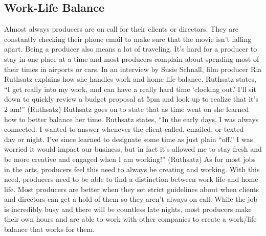 \begin{multicols}{2}
\section{Work-Life Balance}
	Almost always producers are on call for their clients or directors. They are constantly checking their phone email to make sure that the movie isn’t falling apart. Being a producer also means a lot of traveling. It’s hard for a producer to stay in one place at a time and most producers complain about spending most of their times in airports or cars. In an interview by Susie Schnall,  film producer Ria Ruthsatz explains how she handles work and home life balance. Ruthsatz states, “I get really into my work, and can have a really hard time ‘clocking out.’ I’ll sit down to quickly review a budget proposal at 5pm and look up to realize that it’s 2 am!” (Ruthsatz) Ruthsatz goes on to state that as time went on she learned how to better balance her time. Ruthsatz states, “In the early days, I was always connected. I wanted to answer whenever the client called, emailed, or texted—day or night. I’ve since learned to designate some time as just plain “off.” I was worried it would impact our business, but in fact it’s allowed me to stay fresh and be more creative and engaged when I am working!” (Ruthsatz) As for most jobs in the arts, producers feel this need to always be creating and working. With this need, producers need to be able to find a distinction between work life and home life. Most producers are better when they set strict guidelines about when clients and directors can get a hold of them so they aren’t always on call. While the job is incredibly busy and there will be countless late nights, most producers make their own hours and are able to work with other companies to create a work/life balance that works for them.
\end{multicols}